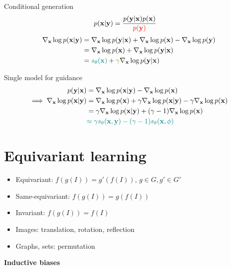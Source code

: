 \documentclass[aspectratio=169,xcolor=dvipsnames]{beamer}
\newcommand{\bx}{\mathbf{x}}
\newcommand{\by}{\mathbf{y}}
\newcommand{\nbx}{\nabla_{\bx}}
\begin{document}
\begin{frame}{Conditional generation}
  \begin{align*}
   p(\bx | \by) &= \frac{p(\by | \bx) p(\bx)}{\textcolor{red}{p(\by)}}
  \end{align*}
  \pause
  \begin{align*}
    \nbx \log p(\bx | \by) &= \nbx \log p(\by | \bx) + \nbx \log p(\bx) - \nbx \log p(\by)\\
                           &= \nbx \log p(\bx) + \nbx \log p(\by | \bx) \\
                           &= \textcolor{teal}{s_\theta(\bx)} + \textcolor{olive}{\gamma} \nbx \log p(\by | \bx)
  \end{align*}
\end{frame}

\begin{frame}{Single model for guidance}
  \begin{align*}
    p(\by | \bx) &= \nbx \log p(\bx | \by) - \nbx \log p(\bx)\\
    \implies  \nbx \log p(\bx | \by) &= \nbx \log p(\bx) + \gamma \nbx \log p(\bx | \by) - \gamma \nbx \log p(\bx) \\
                                     &= \gamma \nbx \log p(\bx | \by) + (\gamma - 1)  \nbx \log p(\bx)\\
                                     &\textcolor{teal}{\approx \gamma s_\theta(\bx, \by) - (\gamma - 1) s_\theta(\bx, \phi)}
  \end{align*}
\end{frame}

\section{Equivariant learning}
\begin{frame}{}
  \begin{itemize}
    \item Equivariant: $f(g(I)) = g'(f(I))$, $g \in G, g' \in G'$
    \pause
    \item Same-equivariant: $f(g(I)) = g(f(I))$
    \pause
    \item Invariant: $f(g(I)) = f(I)$
  \end{itemize}

  \pause

  \vspace{0.5cm}
  \begin{itemize}
    \item Images: translation, rotation, reflection
    \item Graphs, sets: permutation
  \end{itemize}

  \pause

  \vspace{1.5cm}
  \centering
  \textbf{Inductive biases}
\end{frame}
\end{document}
